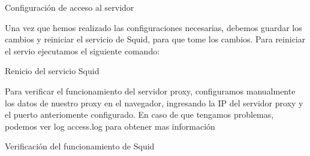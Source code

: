 \begin{listing}[H]
  \caption{Configuración de acceso al servidor}
  \label{soa:tecnologias:squid-cache05:bash-preparacion}
\end{listing}

Una vez que hemos realizado las configuraciones necesarias, debemos guardar los cambios y reiniciar el servicio de Squid, para que tome los cambios.  Para reiniciar el servio ejecutamos el siguiente comando:

\begin{listing}[H]
  \caption{Renicio del servicio Squid}
  \label{soa:tecnologias:squid-cache06:bash-preparacion}
\end{listing}

Para verificar el funcionamiento del servidor proxy, configuramos manualmente los datos de nuestro proxy en el navegador, ingresando la IP del servidor proxy y el puerto anteriomente configurado.
En caso de que tengamos problemas, podemos ver log access.log para obtener mas información

\begin{listing}[H]
  \caption{Verificación del funcionamiento de Squid}
  \label{soa:tecnologias:squid-cache07:bash-preparacion}
\end{listing}
